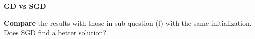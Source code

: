 \item {} \textbf{GD vs SGD}

\textbf{Compare} the results with those in sub-question (f) with the same initialization. Does SGD find a better solution?
